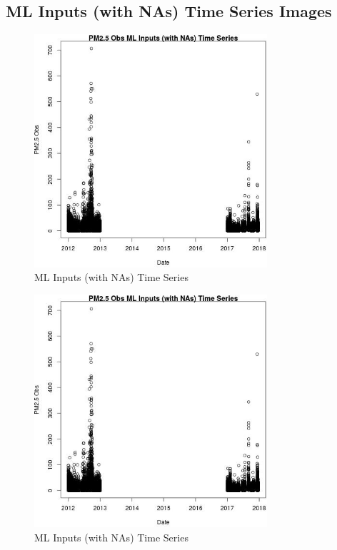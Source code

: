 
\subsection{ML Inputs (with NAs) Time Series Images} 
 

\begin{figure} 
\centering  
\includegraphics[width=0.77\textwidth]{Code_Outputs/Report_ML_input_PM25_Step4_part_e_de_duplicated_aves_compiled_2019-05-14wNAs_PM25_ObsvDate.jpg} 
\caption{\label{fig:Report_ML_input_PM25_Step4_part_e_de_duplicated_aves_compiled_2019-05-14wNAsPM25_ObsvDate}ML Inputs (with NAs) Time Series} 
\end{figure} 
 

\begin{figure} 
\centering  
\includegraphics[width=0.77\textwidth]{Code_Outputs/Report_ML_input_PM25_Step4_part_e_de_duplicated_aves_compiled_2019-05-14wNAs_PM25_ObsvDate.jpg} 
\caption{\label{fig:Report_ML_input_PM25_Step4_part_e_de_duplicated_aves_compiled_2019-05-14wNAsPM25_ObsvDate}ML Inputs (with NAs) Time Series} 
\end{figure} 
 

